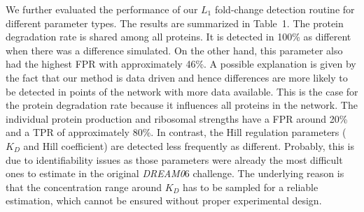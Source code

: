 \documentclass{bioinfo}
\begin{document}
We further evaluated the performance of our $L_1$ fold-change detection routine for different parameter types.
The results are summarized in Table~1\vphantom{\ref{Tab:01}}.
The protein degradation rate is shared among all proteins.
It is detected in 100\% as different when there was a difference simulated.
On the other hand, this parameter also had the highest FPR with approximately 46\%.
A possible explanation is given by the fact that our method is data driven and hence differences are more likely to be detected in points of the network with more data available.
This is the case for the protein degradation rate because it influences all proteins in the network.
The individual protein production and ribosomal strengths have a FPR around 20\% and a TPR of approximately 80\%.
In contrast, the Hill regulation parameters ($K_D$ and Hill coefficient) are detected less frequently as different.
Probably, this is due to identifiability issues as those parameters were already the most difficult ones to estimate in the original \emph{DREAM0}6 challenge.
The underlying reason is that the concentration range around $K_D$ has to be sampled for a reliable estimation, which cannot be ensured without proper experimental design.

\end{document}
